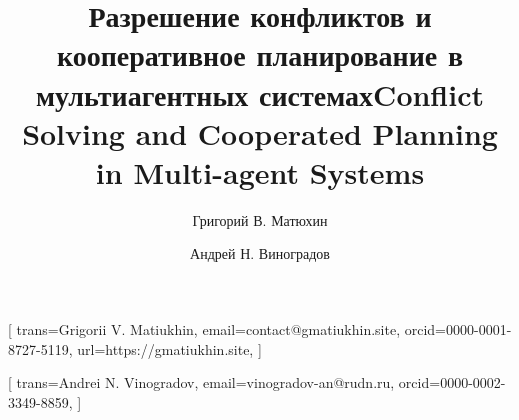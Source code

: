 \documentclass[%
]{ittmm}
\begin{document}



\title{Разрешение конфликтов и кооперативное планирование в мультиагентных системах}
\title[mode=trans]{Conflict Solving and Cooperated Planning in Multi-agent Systems}


\author[1]{Григорий В. Матюхин}[%
trans={Grigorii V. Matiukhin},
email=contact@gmatiukhin.site,
orcid=0000-0001-8727-5119,
url=https://gmatiukhin.site,
]
\cormark[1]

\author[1]{Андрей Н. Виноградов}[%
trans={Andrei N. Vinogradov},
email=vinogradov-an@rudn.ru,
orcid=0000-0002-3349-8859,
]
\address[1]{Российский университет дружбы народов, ул. Миклухо-Маклая, д. 6, Москва, 117198, Российская Федерация}

\end{document}
